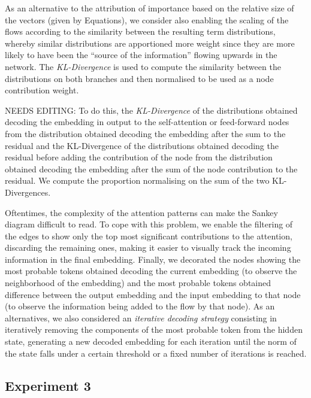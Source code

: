 {As an alternative to the attribution of importance based on the relative size of the vectors (given by Equations), we consider also enabling the scaling of the flows according to the similarity between the resulting term distributions, whereby similar distributions are apportioned more weight since they are more likely to have been the ``source of the information'' flowing upwards in the network.
The \emph{KL-Divergence} is used to compute the similarity between the distributions on both branches and then normalised to be used as a node contribution weight.

NEEDS EDITING: To do this, the \emph{KL-Divergence} of the distributions obtained decoding the embedding in output to the self-attention or feed-forward nodes from the distribution obtained decoding the embedding after the sum to the residual and the KL-Divergence of the distributions obtained decoding the residual before adding the contribution of the node from the distribution obtained decoding the embedding after the sum of the node contribution to the residual.
We compute the proportion normalising on the sum of the two KL-Divergences.
    
Oftentimes, the complexity of the attention patterns can make the Sankey diagram difficult to read.
To cope with this problem, we enable the filtering of the edges to show only the top 
most significant contributions to the attention, discarding the remaining ones, making it easier to visually track the incoming information in the final embedding.
Finally, we decorated the nodes showing the 
most probable tokens obtained decoding the current embedding (to observe the neighborhood of the embedding) and the 
most probable tokens obtained difference between the output embedding and the input embedding to that node (to observe the information being added to the flow by that node).
As an alternatives, we also considered an \emph{iterative decoding strategy} consisting in iteratively removing the components of the most probable token from the hidden state, generating a new decoded embedding for each iteration until the norm of the state falls under a certain threshold or a fixed number of iterations is reached.
}


\subsection{Experiment 3}\label{sec:exp_intravisto_exp3}

